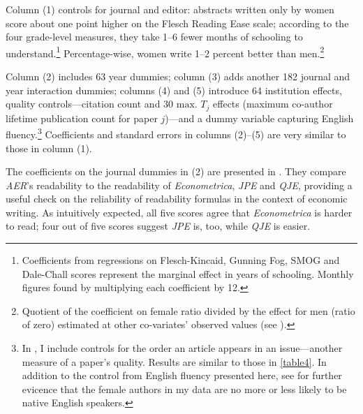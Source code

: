 Column (1) controls for journal and editor: abstracts written only by women score about one point higher on the Flesch Reading Ease scale; according to the four grade-level measures, they take 1--6 fewer months of schooling to understand.\footnote{Coefficients from regressions on Flesch-Kincaid, Gunning Fog, SMOG and Dale-Chall scores represent the marginal effect in years of schooling. Monthly figures found by multiplying each coefficient by 12.} Percentage-wise, women write 1--2 percent better than men.\footnote{Quotient of the coefficient on female ratio divided by the effect for men (ratio of zero) estimated at other co-variates' observed values (see ).}

Column (2) includes 63 year dummies; column (3) adds another 182 journal and year interaction dummies; columns (4) and (5) introduce 64 institution effects, quality controls---citation count and 30 $\text{max. }T_j$ effects (maximum co-author lifetime publication count for paper $j$)---and a dummy variable capturing English fluency.\footnote{In  \citet[][p. 44 and p. 46]{Hengel2016}, I include controls for the order an article appears in an issue---another measure of a paper's quality. Results are similar to those in \autoref{table4}. In addition to the control from English fluency presented here, see \citet[][pp. 35--36]{Hengel2016} for further evicence that the female authors in my data are no more or less likely to be native English speakers.} Coefficients and standard errors in columns (2)--(5) are very similar to those in column (1).

The coefficients on the journal dummies in (2) are presented in . They compare \emph{AER}'s readability to the readability of \emph{Econometrica}, \emph{JPE} and \emph{QJE}, providing a useful check on the reliability of readability formulas in the context of economic writing. As intuitively expected, all five scores agree that \emph{Econometrica} is harder to read; four out of five scores suggest \emph{JPE} is, too, while \emph{QJE} is easier.



